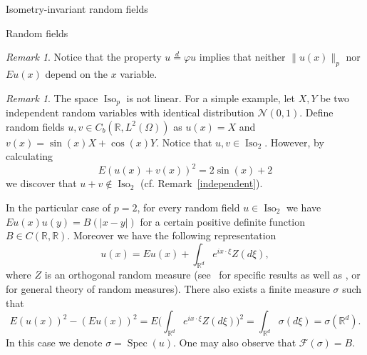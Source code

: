 \documentclass[a4paper,10pt,fleqn]{amsart}
\theoremstyle{remark}
\newtheorem{remark}[theorem]{Remark}
\theoremstyle{definition}
\DeclareMathOperator{\Iso}{Iso}
\DeclareMathOperator{\Spec}{Spec}
\newcommand{\X} {{\mathbb{R}^d}}
\newcommand{\R} {\mathbb{R}}
\renewcommand{\phi} {\varphi}
\renewcommand{\=} {\overset{d}{=}}
\newcommand{\Ld} {{L^2(\Omega)}}
\begin{document}
\begin{section}{Isometry-invariant random fields}
\begin{subsection}{Random fields}
\begin{remark}
  Notice that the property $u\= \phi u$ implies that neither $\|u(x)\|_p$ nor $Eu(x)$ depend on the $x$ variable. 
  \end{remark}
  \begin{remark}
  The space $\Iso_p$ is not linear. For a simple example, let $X,Y$ be two independent random variables with identical distribution $\mathcal{N}(0,1)$.
  Define random fields $u,v\in C_b(\R,\Ld)$ as $u(x) = X$ and $v(x) = \sin(x)X + \cos(x)Y$.
  Notice that $u,v\in\Iso_2$. However, by calculating 
  \begin{equation*}
  E(u(x)+v(x))^2 = 2 \sin(x)+2
  \end{equation*}
  we discover that $u+v\notin\Iso_2$ (cf. Remark~\ref{independent}).
 \end{remark}
  In the particular case of $p=2$, for every random field $u\in\Iso_2$ we have $Eu(x)u(y) = B(|x-y|)$ for a certain positive definite function $B\in C(\R,\R)$. Moreover we have the following representation
  \begin{equation}\label{spectral-representation}
   u(x) = Eu(x) + \int_\X e^{ix\cdot\xi}Z(d\xi),
  \end{equation}
  where $Z$ is an orthogonal random measure (see~\cite[Chapter 1]{MR1009786} for specific results as well as \cite{MR0173945, MR0247660}, or \cite{MR2840012} for general theory of random measures).
  There also exists a finite measure $\sigma$ such that
   \begin{equation*}
    E(u(x))^2-(Eu(x))^2 = E\Big(\int_\X e^{ix\cdot\xi}Z(d\xi)\Big)^2 = \int_\X \sigma(d\xi) = \sigma(\X).
   \end{equation*}
   In this case we denote $\sigma = \Spec(u)$.
   One may also observe that $\mathcal{F}(\sigma)= B$.
   

\end{subsection}
\end{section}
\end{document}
